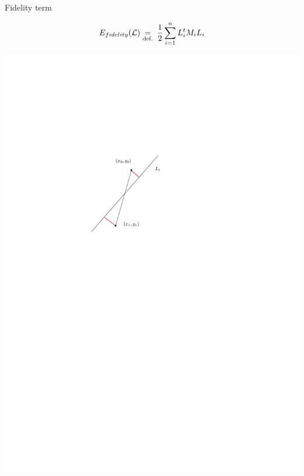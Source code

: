 \begin{frame}[t]{Fidelity term}
\begin{minipage}{0.6\linewidth}
	\pause
	\[
		E_{fidelity}(\mathcal{L}) \underset{\text{def.}}{=} \: \frac{1}{2} \sum_{i = 1}^{n} L_i^t M_i L_i
	\]
	\end{minipage}%
	\hfill
	\begin{minipage}{0.3\linewidth}
		\includegraphics[width=\linewidth]{metric_definition}
	\end{minipage}
\end{frame}

